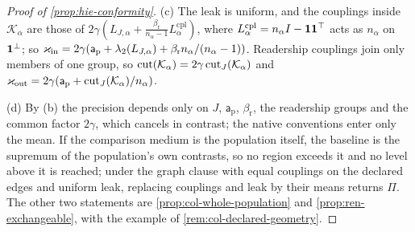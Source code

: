 \begin{proof}[Proof of \cref{prop:hie-conformity}]
(c) The leak is uniform, and the couplings inside $\mathcal K_\alpha$ are those of $2\gamma(L_{J,\alpha}+\frac{\beta_{\mathrm r}}{n_\alpha-1}L^{\mathrm{cpl}}_\alpha)$, where $L^{\mathrm{cpl}}_\alpha=n_\alpha I-\mathbf{1}\mathbf{1}^\top$ acts as $n_\alpha$ on $\mathbf{1}^\perp$; so $\varkappa_{\mathrm{in}}=2\gamma(\mathsf a_{\mathrm p}+\lambda_2(L_{J,\alpha})+\beta_{\mathrm r}n_\alpha/(n_\alpha-1))$. Readership couplings join only members of one group, so $\operatorname{cut}(\mathcal K_\alpha)=2\gamma\operatorname{cut}_J(\mathcal K_\alpha)$ and $\varkappa_{\mathrm{out}}=2\gamma(\mathsf a_{\mathrm p}+\operatorname{cut}_J(\mathcal K_\alpha)/n_\alpha)$.

(d) By (b) the precision depends only on $J$, $\mathsf a_{\mathrm p}$, $\beta_{\mathrm r}$, the readership groups and the common factor $2\gamma$, which cancels in contrast; the native conventions enter only the mean. If the comparison medium is the population itself, the baseline is the supremum of the population's own contrasts, so no region exceeds it and no level above it is reached; under the graph clause with equal couplings on the declared edges and uniform leak, replacing couplings and leak by their means returns $\Pi$. The other two statements are \cref{prop:col-whole-population} and \cref{prop:ren-exchangeable}, with the example of \cref{rem:col-declared-geometry}.


\end{proof}
